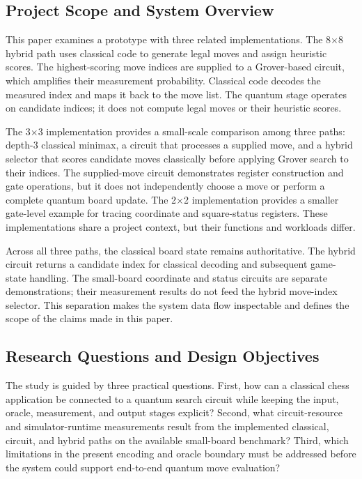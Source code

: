 \documentclass[conference]{IEEEtran}
\begin{document}
\subsection{Project Scope and System Overview}
This paper examines a prototype with three related implementations. The 8$\times$8 hybrid path uses classical code to generate legal moves and assign heuristic scores. The highest-scoring move indices are supplied to a Grover-based circuit, which amplifies their measurement probability. Classical code decodes the measured index and maps it back to the move list. The quantum stage operates on candidate indices; it does not compute legal moves or their heuristic scores.

The 3$\times$3 implementation provides a small-scale comparison among three paths: depth-3 classical minimax, a circuit that processes a supplied move, and a hybrid selector that scores candidate moves classically before applying Grover search to their indices. The supplied-move circuit demonstrates register construction and gate operations, but it does not independently choose a move or perform a complete quantum board update. The 2$\times$2 implementation provides a smaller gate-level example for tracing coordinate and square-status registers. These implementations share a project context, but their functions and workloads differ.

Across all three paths, the classical board state remains authoritative. The hybrid circuit returns a candidate index for classical decoding and subsequent game-state handling. The small-board coordinate and status circuits are separate demonstrations; their measurement results do not feed the hybrid move-index selector. This separation makes the system data flow inspectable and defines the scope of the claims made in this paper.

\subsection{Research Questions and Design Objectives}
The study is guided by three practical questions. First, how can a classical chess application be connected to a quantum search circuit while keeping the input, oracle, measurement, and output stages explicit? Second, what circuit-resource and simulator-runtime measurements result from the implemented classical, circuit, and hybrid paths on the available small-board benchmark? Third, which limitations in the present encoding and oracle boundary must be addressed before the system could support end-to-end quantum move evaluation?
\end{document}
